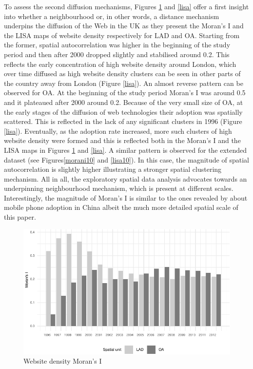 \documentclass[
  authoryear,
  preprint,
  3p]{elsarticle}
\begin{document}
To assess the second diffusion mechanisms, Figures \ref{morani} and
\ref{lisa} offer a first insight into whether a neighbourhood or, in
other words, a distance mechanism underpins the diffusion of the Web in
the UK as they present the Moran's I and the LISA maps of website
density respectively for LAD and OA. Starting from the former, spatial
autocorrelation was higher in the beginning of the study period and then
after 2000 dropped slightly and stabilised around 0.2. This reflects the
early concentration of high website density around London, which over
time diffused as high website density clusters can be seen in other
parts of the country away from London (Figure \ref{lisa}). An almost
reverse pattern can be observed for OA. At the beginning of the study
period Moran's I was around 0.5 and it plateaued after 2000 around 0.2.
Because of the very small size of OA, at the early stages of the
diffusion of web technologies their adoption was spatially scattered.
This is reflected in the lack of any significant clusters in 1996
(Figure \ref{lisa}). Eventually, as the adoption rate increased, more
such clusters of high website density were formed and this is reflected
both in the Moran's I and the LISA maps in Figures \ref{morani} and
\ref{lisa}. A similar pattern is observed for the extended dataset (see
Figures\ref{morani10} and \ref{lisa10}). In this case, the magnitude of
spatial autocorrelation is slightly higher illustrating a stronger
spatial clustering mechanism. All in all, the exploratory spatial data
analysis advocates towards an underpinning neighbourhood mechanism,
which is present at different scales. Interestingly, the magnitude of
Moran's I is similar to the ones revealed by \citet{ding2010modeling}
about mobile phone adoption in China albeit the much more detailed
spatial scale of this paper.

\begin{figure}[H]

{\centering \includegraphics[width=1\textwidth,height=\textheight]{anonymised_files/figure-pdf/morani-1.pdf}

}

\caption{\label{morani}Website density Moran's I}

\end{figure}%
\end{document}
